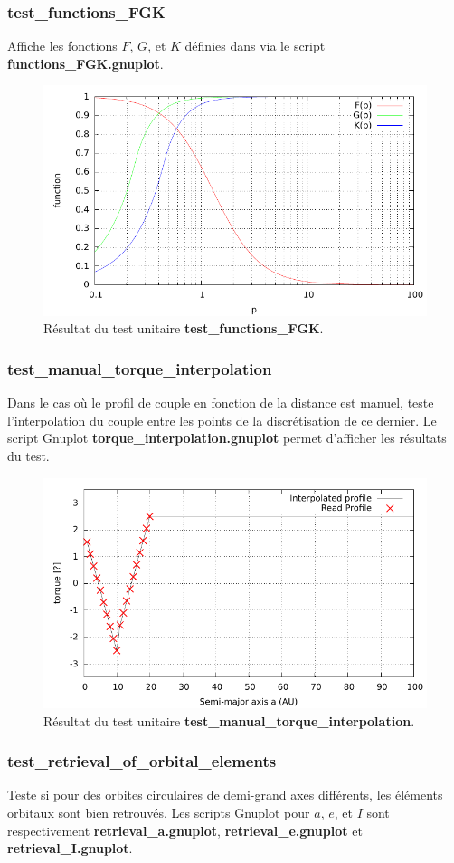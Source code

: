 \subsubsection{test\_functions\_FGK}
Affiche les fonctions $F$, $G$, et $K$ définies dans \cite{paardekooper2011torque} via le script \textbf{functions\_FGK.gnuplot}.

\begin{figure}[htbp]
\centering
\includegraphics[width=0.65\linewidth]{figure/unitary_tests/functions_FGK.pdf}
\caption{Résultat du test unitaire \textbf{test\_functions\_FGK}.}
\end{figure}

\subsubsection{test\_manual\_torque\_interpolation}
Dans le cas où le profil de couple en fonction de la distance est manuel, teste l'interpolation du couple entre les points de la discrétisation de ce dernier. Le script Gnuplot \textbf{torque\_interpolation.gnuplot} permet d'afficher les résultats du test.

\begin{figure}[htbp]
\centering
\includegraphics[width=0.65\linewidth]{figure/unitary_tests/torque_interpolation.pdf}
\caption{Résultat du test unitaire \textbf{test\_manual\_torque\_interpolation}.}
\end{figure}

\subsubsection{test\_retrieval\_of\_orbital\_elements}
Teste si pour des orbites circulaires de demi-grand axes différents, les éléments orbitaux sont bien retrouvés. Les scripts Gnuplot pour $a$, $e$, et $I$ sont respectivement \textbf{retrieval\_a.gnuplot}, \textbf{retrieval\_e.gnuplot} et \textbf{retrieval\_I.gnuplot}.

